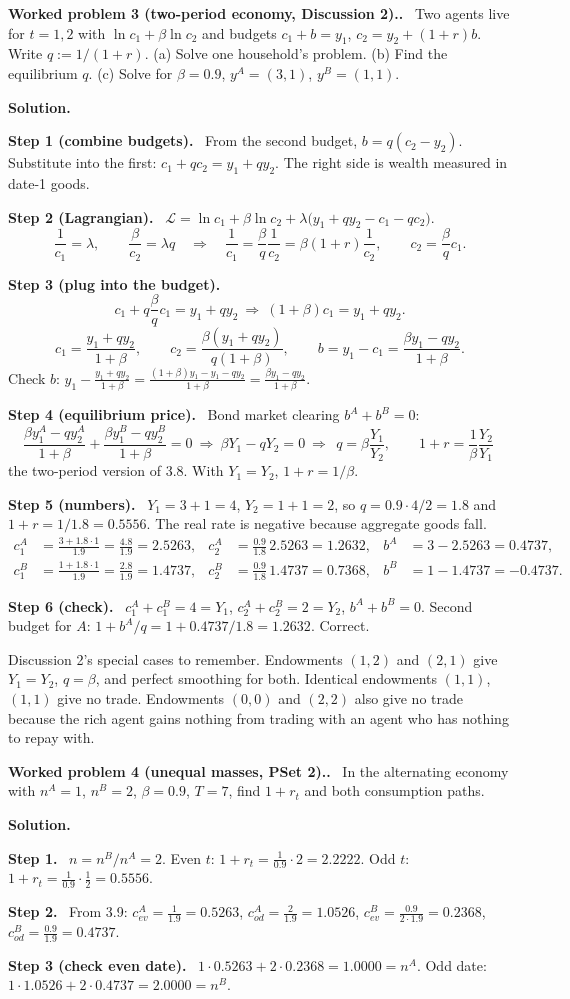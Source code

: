\documentclass[12pt]{article}
\newcommand{\st}[1]{\par\smallskip\textbf{Step #1.}\ }
\newcommand{\ans}[1]{\[\boxed{\ #1\ }\]}
\newcommand{\prob}[1]{\par\bigskip\textbf{Worked problem #1.}\ }
\newcommand{\sol}{\par\smallskip\textbf{Solution.}\par}
\begin{document}
\prob{3 (two-period economy, Discussion 2).} Two agents live for $t=1,2$ with
$\ln c_1+\beta\ln c_2$ and budgets $c_1+b=y_1$, $c_2=y_2+(1+r)b$. Write
$q:=1/(1+r)$. (a) Solve one household's problem. (b) Find the equilibrium $q$.
(c) Solve for $\beta=0.9$, $y^A=(3,1)$, $y^B=(1,1)$.
\sol
\st{1 (combine budgets)} From the second budget, $b=q(c_2-y_2)$. Substitute into
the first: $c_1+qc_2=y_1+qy_2$. The right side is wealth measured in date-1 goods.
\st{2 (Lagrangian)} $\mathcal L=\ln c_1+\beta\ln c_2+\lambda\big(y_1+qy_2-c_1-qc_2\big)$.
\[
\frac{1}{c_1}=\lambda,\qquad\frac{\beta}{c_2}=\lambda q\quad\Longrightarrow\quad\frac{1}{c_1}=\frac{\beta}{q}\frac{1}{c_2}=\beta(1+r)\frac{1}{c_2},\qquad c_2=\frac{\beta}{q}c_1 .
\]
\st{3 (plug into the budget)}
\[
c_1+q\frac{\beta}{q}c_1=y_1+qy_2\ \Longrightarrow\ (1+\beta)c_1=y_1+qy_2 .
\]
\ans{c_1=\frac{y_1+qy_2}{1+\beta},\qquad c_2=\frac{\beta(y_1+qy_2)}{q(1+\beta)},\qquad b=y_1-c_1=\frac{\beta y_1-qy_2}{1+\beta}.}
Check $b$: $y_1-\frac{y_1+qy_2}{1+\beta}=\frac{(1+\beta)y_1-y_1-qy_2}{1+\beta}=\frac{\beta y_1-qy_2}{1+\beta}$.
\st{4 (equilibrium price)} Bond market clearing $b^A+b^B=0$:
\[
\frac{\beta y^A_1-qy^A_2}{1+\beta}+\frac{\beta y^B_1-qy^B_2}{1+\beta}=0\ \Longrightarrow\ \beta Y_1-qY_2=0
\ \Longrightarrow\ \boxed{\ q=\beta\frac{Y_1}{Y_2},\qquad 1+r=\frac1\beta\frac{Y_2}{Y_1}\ }
\]
the two-period version of 3.8. With $Y_1=Y_2$, $1+r=1/\beta$.
\st{5 (numbers)} $Y_1=3+1=4$, $Y_2=1+1=2$, so $q=0.9\cdot4/2=1.8$ and $1+r=1/1.8=0.5556$. The real rate is negative because aggregate goods fall.
\begin{align*}
c^A_1&=\frac{3+1.8\cdot1}{1.9}=\frac{4.8}{1.9}=2.5263, & c^A_2&=\frac{0.9}{1.8}\,2.5263=1.2632, & b^A&=3-2.5263=0.4737,\\
c^B_1&=\frac{1+1.8\cdot1}{1.9}=\frac{2.8}{1.9}=1.4737, & c^B_2&=\frac{0.9}{1.8}\,1.4737=0.7368, & b^B&=1-1.4737=-0.4737.
\end{align*}
\st{6 (check)} $c^A_1+c^B_1=4=Y_1$, $c^A_2+c^B_2=2=Y_2$, $b^A+b^B=0$. Second budget for $A$:
$1+b^A/q=1+0.4737/1.8=1.2632$. Correct.

Discussion 2's special cases to remember. Endowments $(1,2)$ and $(2,1)$ give
$Y_1=Y_2$, $q=\beta$, and perfect smoothing for both. Identical endowments
$(1,1)$, $(1,1)$ give no trade. Endowments $(0,0)$ and $(2,2)$ also give no
trade because the rich agent gains nothing from trading with an agent who has
nothing to repay with.

\prob{4 (unequal masses, PSet 2).} In the alternating economy with $n^A=1$,
$n^B=2$, $\beta=0.9$, $T=7$, find $1+r_t$ and both consumption paths.
\sol
\st{1} $n=n^B/n^A=2$. Even $t$: $1+r_t=\frac{1}{0.9}\cdot2=2.2222$. Odd $t$: $1+r_t=\frac{1}{0.9}\cdot\frac12=0.5556$.
\st{2} From 3.9: $c^A_{ev}=\frac{1}{1.9}=0.5263$, $c^A_{od}=\frac{2}{1.9}=1.0526$, $c^B_{ev}=\frac{0.9}{2\cdot1.9}=0.2368$, $c^B_{od}=\frac{0.9}{1.9}=0.4737$.
\st{3 (check even date)} $1\cdot0.5263+2\cdot0.2368=1.0000=n^A$. Odd date: $1\cdot1.0526+2\cdot0.4737=2.0000=n^B$.
\end{document}
